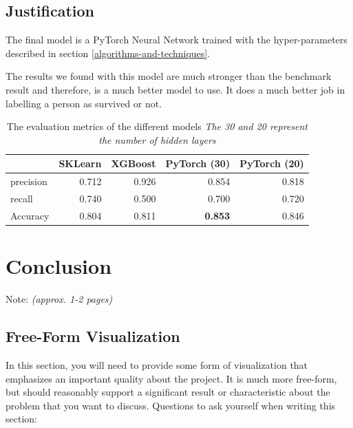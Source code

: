 \documentclass{article}
\begin{document}
\subsection{Justification}\label{justification}

The final model is a PyTorch Neural Network trained with the
hyper-parameters described in section \ref{algorithms-and-techniques}.

The results we found with this model are much stronger than the benchmark
result and therefore, is a much better model to use. It does a much better
job in labelling a person as survived or not.

\begin{center}
    \begin{table}[h]
        \begin{tabular}{lrrrr}
            \hline
            {} &     SKLearn &     XGBoost  &         PyTorch (30) &  PyTorch (20) \\
            \hline
            precision &     0.712 &     0.926 &     0.854 &     0.818  \\
            recall    &     0.740 &     0.500 &     0.700 &     0.720  \\
            \hline
            Accuracy  &     0.804 &     0.811 &   \textbf{0.853} &    0.846  \\
            \hline
        \end{tabular}
        \caption{\label{tab:data-results}The evaluation metrics of the different models 
            \emph{The 30 and 20 represent the number of hidden layers}}
    \end{table}
\end{center}

\section{Conclusion}\label{conclusion}

Note: \emph{(approx. 1-2 pages)}


\subsection{Free-Form Visualization}\label{free-form-visualization}

In this section, you will need to provide some form of visualization
that emphasizes an important quality about the project. It is much more
free-form, but should reasonably support a significant result or
characteristic about the problem that you want to discuss. Questions to
ask yourself when writing this section:
\end{document}
